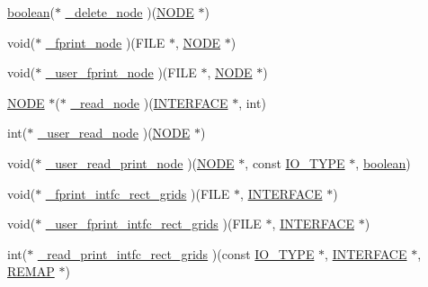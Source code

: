 \begin{DoxyCompactItemize}
\item 
\hyperlink{cdecs_8h_ad048433382a936258fb49e2ec4f148e1}{boolean}($\ast$ \hyperlink{struct___i___u_s_e_r___i_n_t_e_r_f_a_c_e_a32627e9ca0aec6bd0dfe9ed0776a4d48}{\+\_\+delete\+\_\+node} )(\hyperlink{int_8h_a65acc517559b106aa8e5fe339247ddcd}{N\+O\+DE} $\ast$)
\item 
void($\ast$ \hyperlink{struct___i___u_s_e_r___i_n_t_e_r_f_a_c_e_ad8f0b47959f682cf7a67f9ecf68f0fd5}{\+\_\+fprint\+\_\+node} )(F\+I\+LE $\ast$, \hyperlink{int_8h_a65acc517559b106aa8e5fe339247ddcd}{N\+O\+DE} $\ast$)
\item 
void($\ast$ \hyperlink{struct___i___u_s_e_r___i_n_t_e_r_f_a_c_e_a496c593292a642a3d906d02348ac0839}{\+\_\+user\+\_\+fprint\+\_\+node} )(F\+I\+LE $\ast$, \hyperlink{int_8h_a65acc517559b106aa8e5fe339247ddcd}{N\+O\+DE} $\ast$)
\item 
\hyperlink{int_8h_a65acc517559b106aa8e5fe339247ddcd}{N\+O\+DE} $\ast$($\ast$ \hyperlink{struct___i___u_s_e_r___i_n_t_e_r_f_a_c_e_ad632bfc0b35400aabc9aaa40aa3b8ed3}{\+\_\+read\+\_\+node} )(\hyperlink{int_8h_a58cf562d0d320a608294b7310ea167dc}{I\+N\+T\+E\+R\+F\+A\+CE} $\ast$, int)
\item 
int($\ast$ \hyperlink{struct___i___u_s_e_r___i_n_t_e_r_f_a_c_e_aec225d5b8dc6909c1fe6609ae092a7a1}{\+\_\+user\+\_\+read\+\_\+node} )(\hyperlink{int_8h_a65acc517559b106aa8e5fe339247ddcd}{N\+O\+DE} $\ast$)
\item 
void($\ast$ \hyperlink{struct___i___u_s_e_r___i_n_t_e_r_f_a_c_e_af6dd9cb2a3c35ed13f875437b6d22143}{\+\_\+user\+\_\+read\+\_\+print\+\_\+node} )(\hyperlink{int_8h_a65acc517559b106aa8e5fe339247ddcd}{N\+O\+DE} $\ast$, const \hyperlink{cdecs_8h_ab53ca65803ae78b17636e622a6f2a062}{I\+O\+\_\+\+T\+Y\+PE} $\ast$, \hyperlink{cdecs_8h_ad048433382a936258fb49e2ec4f148e1}{boolean})
\item 
void($\ast$ \hyperlink{struct___i___u_s_e_r___i_n_t_e_r_f_a_c_e_a1664b6eef5213b1897f25c6b06326a83}{\+\_\+fprint\+\_\+intfc\+\_\+rect\+\_\+grids} )(F\+I\+LE $\ast$, \hyperlink{int_8h_a58cf562d0d320a608294b7310ea167dc}{I\+N\+T\+E\+R\+F\+A\+CE} $\ast$)
\item 
void($\ast$ \hyperlink{struct___i___u_s_e_r___i_n_t_e_r_f_a_c_e_a2cf5f73ee4db0cd82f5bbe2549555b61}{\+\_\+user\+\_\+fprint\+\_\+intfc\+\_\+rect\+\_\+grids} )(F\+I\+LE $\ast$, \hyperlink{int_8h_a58cf562d0d320a608294b7310ea167dc}{I\+N\+T\+E\+R\+F\+A\+CE} $\ast$)
\item 
int($\ast$ \hyperlink{struct___i___u_s_e_r___i_n_t_e_r_f_a_c_e_a998ea357078f65f94e51059bae90fae9}{\+\_\+read\+\_\+print\+\_\+intfc\+\_\+rect\+\_\+grids} )(const \hyperlink{cdecs_8h_ab53ca65803ae78b17636e622a6f2a062}{I\+O\+\_\+\+T\+Y\+PE} $\ast$, \hyperlink{int_8h_a58cf562d0d320a608294b7310ea167dc}{I\+N\+T\+E\+R\+F\+A\+CE} $\ast$, \hyperlink{geom_8h_a9f186bf2d7b393ae0b2f5568018b54e4}{R\+E\+M\+AP} $\ast$)

\end{DoxyCompactItemize}
